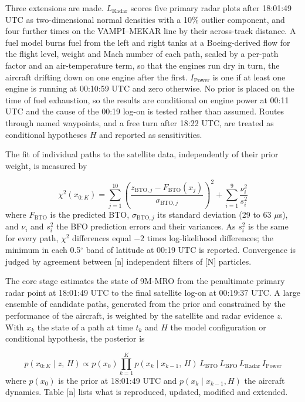 Three extensions are made. $L_{\mathrm{Radar}}$ scores five primary radar plots after 18:01:49 UTC as two-dimensional normal densities with a 10\% outlier component, and four further times on the VAMPI--MEKAR line by their across-track distance. A fuel model burns fuel from the left and right tanks at a Boeing-derived flow for the flight level, weight and Mach number of each path, scaled by a per-path factor and an air-temperature term, so that the engines run dry in turn, the aircraft drifting down on one engine after the first. $I_{\mathrm{Power}}$ is one if at least one engine is running at 00:10:59 UTC and zero otherwise. No prior is placed on the time of fuel exhaustion, so the results are conditional on engine power at 00:11 UTC and the cause of the 00:19 log-on is tested rather than assumed. Routes through named waypoints, and a free turn after 18:22 UTC, are treated as conditional hypotheses $H$ and reported as sensitivities.

The fit of individual paths to the satellite data, independently of their prior weight, is measured by

\begin{equation}
\chi^{2}\left(x_{0:K}\right) = \sum_{j=1}^{10} \left(\frac{z_{\mathrm{BTO},j} - F_{\mathrm{BTO}}\left(x_{j}\right)}{\sigma_{\mathrm{BTO},j}}\right)^{2} + \sum_{i=1}^{9} \frac{\nu_{i}^{2}}{s_{i}^{2}}
\label{eq:31A-5}
\end{equation}
where $F_{\mathrm{BTO}}$ is the predicted BTO, $\sigma_{\mathrm{BTO},j}$ its standard deviation (29 to 63 $\mu$s), and $\nu_i$ and $s_i^2$ the BFO prediction errors and their variances. As $s_i^2$ is the same for every path, $\chi^2$ differences equal $-2$ times log-likelihood differences; the minimum in each 0.5$^{\circ}$ band of latitude at 00:19 UTC is reported. Convergence is judged by agreement between [n] independent filters of [N] particles.


\setcounter{equation}{2}
The core stage estimates the state of 9M-MRO from the penultimate primary radar point at 18:01:49 UTC to the final satellite log-on at 00:19:37 UTC. A large ensemble of candidate paths, generated from the prior and constrained by the performance of the aircraft, is weighted by the satellite and radar evidence $z$. With $x_k$ the state of a path at time $t_k$ and $H$ the model configuration or conditional hypothesis, the posterior is

\begin{equation}
p\left(x_{0:K} \mid z,\, H\right) \propto p\left(x_{0}\right) \prod_{k=1}^{K} p\left(x_{k} \mid x_{k-1},\, H\right)\, L_{\mathrm{BTO}}\, L_{\mathrm{BFO}}\, L_{\mathrm{Radar}}\, I_{\mathrm{Power}}
\label{eq:31B-3}
\end{equation}
where $p(x_0)$ is the prior at 18:01:49 UTC and $p(x_k \mid x_{k-1}, H)$ the aircraft dynamics. Table [n] lists what is reproduced, updated, modified and extended.

